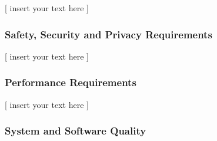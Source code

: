 \documentclass[twoside,letterpaper]{article}
\begin{document}
[ insert your text here ]

\subsubsection{Safety, Security and Privacy Requirements}

[ insert your text here ]%

\subsubsection{Performance Requirements}

[ insert your text here ] %

\subsubsection{System and Software Quality}
\end{document}
